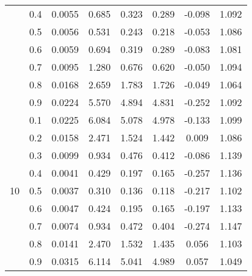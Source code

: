 \documentclass[11pt,a4paper]{report}
\begin{document}
\begin{longtable}{ | c | c || c | c | c | c | c | c | }
 & 0.4 & 0.0055 & 0.685 & 0.323 & 0.289 & -0.098 & 1.092 \\
 & 0.5 & 0.0056 & 0.531 & 0.243 & 0.218 & -0.053 & 1.086 \\
 & 0.6 & 0.0059 & 0.694 & 0.319 & 0.289 & -0.083 & 1.081 \\
 & 0.7 & 0.0095 & 1.280 & 0.676 & 0.620 & -0.050 & 1.094 \\
 & 0.8 & 0.0168 & 2.659 & 1.783 & 1.726 & -0.049 & 1.064 \\
 & 0.9 & 0.0224 & 5.570 & 4.894 & 4.831 & -0.252 & 1.092 \\
 \hline
\multirow{9}{*}{10} & 0.1 & 0.0225 & 6.084 & 5.078 & 4.978 & -0.133 & 1.099 \\
 & 0.2 & 0.0158 & 2.471 & 1.524 & 1.442 & 0.009 & 1.086 \\
 & 0.3 & 0.0099 & 0.934 & 0.476 & 0.412 & -0.086 & 1.139 \\
 & 0.4 & 0.0041 & 0.429 & 0.197 & 0.165 & -0.257 & 1.136 \\
 & 0.5 & 0.0037 & 0.310 & 0.136 & 0.118 & -0.217 & 1.102 \\
 & 0.6 & 0.0047 & 0.424 & 0.195 & 0.165 & -0.197 & 1.133 \\
 & 0.7 & 0.0074 & 0.934 & 0.472 & 0.404 & -0.274 & 1.147 \\
 & 0.8 & 0.0141 & 2.470 & 1.532 & 1.435 & 0.056 & 1.103 \\
 & 0.9 & 0.0315 & 6.114 & 5.041 & 4.989 & 0.057 & 1.049 \\
 \hline
\hline
\end{longtable}
\end{document}
